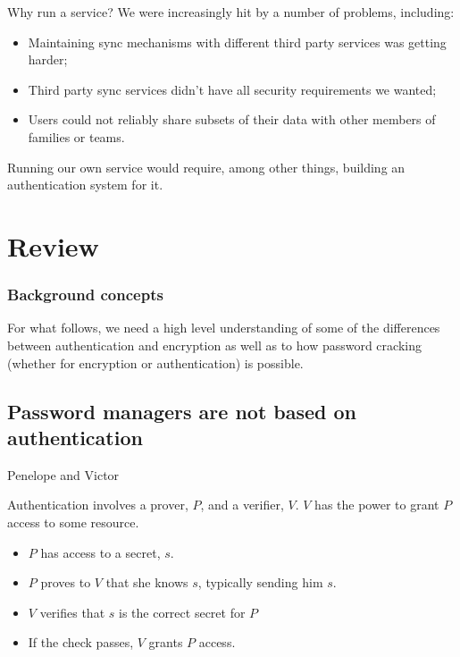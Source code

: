 \documentclass[xcolor={dvipsnames,table,hyperref}]{beamer}
\begin{document}
\begin{frame}{Why run a service?}
  We were increasingly hit by a number of problems, including:
  \begin{itemize}
    \item Maintaining sync mechanisms with different third party services was getting harder;
    \item Third party sync services didn't have all security requirements we wanted;
    \item Users could not reliably share subsets of their data with other members of families or teams.
  \end{itemize}
  Running our own service would require, among other things, building an authentication system for it.
\end{frame}

\section{Review}

\begin{frame}
  \frametitle{Background concepts}

  For what follows, we need a high level understanding of some of the differences between authentication and encryption as well as to how password cracking (whether for encryption or authentication) is possible.
\end{frame}

\subsection{Password managers are not based on authentication}

\begin{frame}{Penelope and Victor}

  Authentication involves a prover, $P$, and a verifier, $V$.
  $V$ has the power to grant $P$ access to some resource.


  \begin{itemize}
    \item $P$ has access to a secret, $s$.
    \item $P$ proves to $V$ that she knows $s$, typically sending him $s$.
    \item $V$ verifies that $s$ is the correct secret for $P$
    \item If the check passes, $V$ grants $P$ access.
  \end{itemize}
\end{frame}
\end{document}
